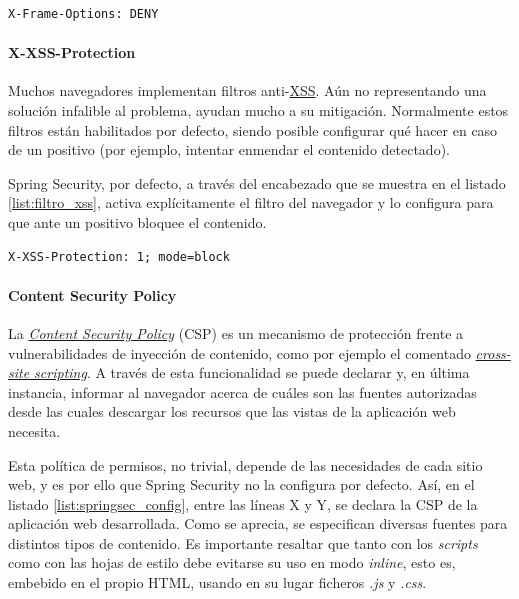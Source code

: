 \documentclass[a4paper]{article}
\begin{document}
	\begin{lstlisting}[caption=Cabecera que inhibe el uso de las etiquetas \emph{iframe}, label=list:iframe]
	 X-Frame-Options: DENY
	\end{lstlisting}
	
	\paragraph{X-XSS-Protection}
	Muchos navegadores implementan filtros anti-\href{https://owasp.org/www-community/attacks/xss/}{XSS}. Aún no representando una solución infalible al problema, ayudan mucho a su mitigación. Normalmente estos filtros están habilitados por defecto, siendo posible configurar qué hacer en caso de un positivo (por ejemplo, intentar enmendar el contenido detectado).
	
	Spring Security, por defecto, a través del encabezado que se muestra en el listado \ref{list:filtro_xss}, activa explícitamente el filtro del navegador y lo configura para que ante un positivo bloquee el contenido.
	\\
	
	\begin{lstlisting}[caption=Cabecera que activa y configura el filtro anti-XSS del navegador, label=list:filtro_xss]
	X-XSS-Protection: 1; mode=block
	\end{lstlisting}
	
	\paragraph{Content Security Policy}
	La \href{https://developer.mozilla.org/en-US/docs/Web/HTTP/CSP}{\emph{Content Security Policy}} (CSP) es un mecanismo de protección frente a vulnerabilidades de inyección de contenido, como por ejemplo el comentado \href{https://owasp.org/www-community/attacks/xss/}{\emph{cross-site scripting}}. A través de esta funcionalidad se puede declarar y, en última instancia, informar al navegador acerca de cuáles son las fuentes autorizadas desde las cuales descargar los recursos que las vistas de la aplicación web necesita.
	
	Esta política de permisos, no trivial, depende de las necesidades de cada sitio web, y es por ello que Spring Security no la configura por defecto. Así, en el listado \ref{list:springsec_config}, entre las líneas X y Y, se declara la CSP de la aplicación web desarrollada. Como se aprecia, se especifican diversas fuentes para distintos tipos de contenido. Es importante resaltar que tanto con los \emph{scripts} como con las hojas de estilo debe evitarse su uso en modo \emph{inline}, esto es, embebido en el propio HTML, usando en su lugar ficheros \emph{.js} y \emph{.css}.
	
\end{document}
